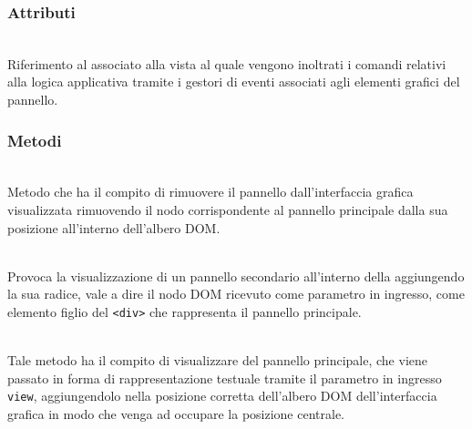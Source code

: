 \subsubsection*{Attributi}
\begin{description}
  \item{}\\
  Riferimento al  associato alla vista al quale vengono inoltrati i comandi relativi alla logica applicativa tramite i gestori di eventi associati agli elementi grafici del pannello.
\end{description}

\subsubsection*{Metodi}
\begin{description}
  \item{}\\
  Metodo che ha il compito di rimuovere il pannello dall'interfaccia grafica visualizzata rimuovendo il nodo corrispondente al pannello principale dalla sua posizione all'interno dell'albero DOM\@.
  
  \item{}\\
  Provoca la visualizzazione di un pannello secondario all'interno della  aggiungendo la sua radice, vale a dire il nodo DOM ricevuto come parametro in ingresso, come elemento figlio del \verb'<div>' che rappresenta il pannello principale.

  \item{}\\
  Tale metodo ha il compito di visualizzare del pannello principale, che viene passato in forma di rappresentazione testuale tramite il parametro in ingresso \verb'view', aggiungendolo nella posizione corretta dell'albero DOM dell'interfaccia grafica in modo che venga ad occupare la posizione centrale.
  
\end{description}

